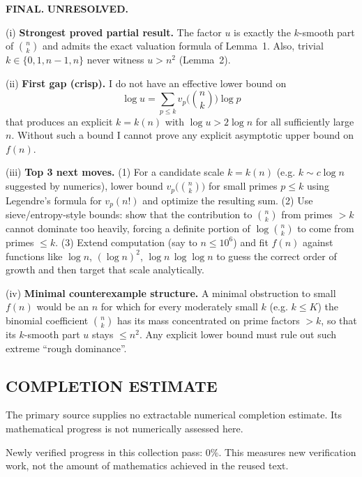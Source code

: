 \textbf{FINAL.}
\textbf{UNRESOLVED.}

(i) \textbf{Strongest proved partial result.}
The factor $u$ is exactly the $k$-smooth part of $\binom{n}{k}$ and admits the exact valuation formula of Lemma~1. Also, trivial $k\in\{0,1,n-1,n\}$ never witness $u>n^{2}$ (Lemma~2).

(ii) \textbf{First gap (crisp).}
I do not have an effective lower bound on
\[\log u = \sum_{p\le k} v_p\bigl(\binom{n}{k}\bigr)\log p\]
that produces an explicit $k=k(n)$ with $\log u > 2\log n$ for all sufficiently large $n$. Without such a bound I cannot prove any explicit asymptotic upper bound on $f(n)$.

(iii) \textbf{Top 3 next moves.}
(1) For a candidate scale $k=k(n)$ (e.g. $k\sim c\log n$ suggested by numerics), lower bound $v_p\bigl(\binom{n}{k}\bigr)$ for small primes $p\le k$ using Legendre's formula for $v_p(n!)$ and optimize the resulting sum.
(2) Use sieve/entropy-style bounds: show that the contribution to $\binom{n}{k}$ from primes $>k$ cannot dominate too heavily, forcing a definite portion of $\log\binom{n}{k}$ to come from primes $\le k$.
(3) Extend computation (say to $n\le 10^{6}$) and fit $f(n)$ against functions like $\log n$, $(\log n)^2$, $\log n\,\log\log n$ to guess the correct order of growth and then target that scale analytically.

(iv) \textbf{Minimal counterexample structure.}
A minimal obstruction to small $f(n)$ would be an $n$ for which for every moderately small $k$ (e.g. $k\le K$) the binomial coefficient $\binom{n}{k}$ has its mass concentrated on prime factors $>k$, so that its $k$-smooth part $u$ stays $\le n^{2}$. Any explicit lower bound must rule out such extreme ``rough dominance''.


\subsection*{COMPLETION ESTIMATE}
The primary source supplies no extractable numerical completion estimate. Its mathematical progress is not numerically assessed here.

Newly verified progress in this collection pass: $0\%$. This measures new verification work, not the amount of mathematics achieved in the reused text.
